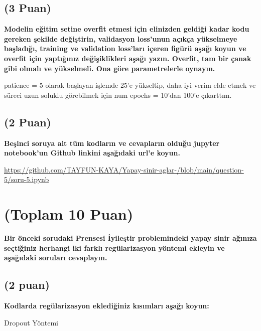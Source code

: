 \documentclass[11pt]{article}
\begin{document}
\subsection{(3 Puan)} \textbf{Modelin eğitim setine overfit etmesi için elinizden geldiği kadar kodu gereken şekilde değiştirin, validasyon loss'unun açıkça yükselmeye başladığı, training ve validation loss'ları içeren figürü aşağı koyun ve overfit için yaptığınız değişiklikleri aşağı yazın. Overfit, tam bir çanak gibi olmalı ve yükselmeli. Ona göre parametrelerle oynayın.}

patience = 5 olarak başlayan işlemde 25'e yükseltip, daha iyi verim elde etmek ve süreci 
uzun soluklu görebilmek için num epochs = 10'dan 100'e çıkarttım.

\begin{comment}
\begin{figure}[ht!]
    \centering
    \texttt{[image: mypicturehere.png]}
    \caption{Buraya açıklama yazın}
    \label{fig:my_pic}
\end{figure}
\end{comment}

\subsection{(2 Puan)} \textbf{Beşinci soruya ait tüm kodların ve cevapların olduğu jupyter notebook'un Github linkini aşağıdaki url'e koyun.}

\url{https://github.com/TAYFUN-KAYA/Yapay-sinir-aglar-/blob/main/question-5/soru-5.ipynb}

\section{(Toplam 10 Puan)} \textbf{Bir önceki sorudaki Prensesi İyileştir problemindeki yapay sinir ağınıza seçtiğiniz herhangi iki farklı regülarizasyon yöntemi ekleyin ve aşağıdaki soruları cevaplayın.} 

\subsection{(2 puan)} \textbf{Kodlarda regülarizasyon eklediğiniz kısımları aşağı koyun:} 

Dropout Yöntemi
\end{document}
